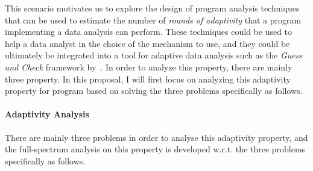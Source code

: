 This scenario motivates us to explore the design of program analysis techniques that can be used to estimate the number of \emph{rounds of adaptivity} that a program implementing a data analysis can perform. These techniques could be used to help a data analyst in the choice of the mechanism to use,
and they
could be ultimately be integrated into a tool for adaptive data analysis such as the \emph{Guess and Check} framework by~\cite{RogersRSSTW20}. 
%
In order to analyze this property, there are mainly three property. 
In this proposal, I will first focus on analyzing 
this adaptivity property for program based on solving the three problems specifically as follows.
\paragraph*{Adaptivity Analysis}
There are mainly three problems in order to analyse this adaptivity property, 
and the full-spectrum analysis on this property is 
developed w.r.t. the three problems specifically as follows.

